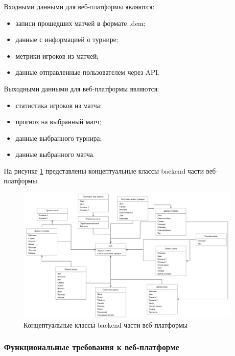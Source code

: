 Входными данными для веб-платформы являются:
\begin{itemize}
	\item записи прошедших матчей в формате .dem;
	\item данные с информацией о турнире;
	\item метрики игроков из матчей;
	\item данные отправленные пользователем через API.
\end{itemize}

Выходными данными для веб-платформы являются:
\begin{itemize}
	\item статистика игроков из матча;
	\item прогноз на выбранный матч;
	\item данные выбранного турнира;
	\item данные выбранного матча.
\end{itemize}

На рисунке \ref{fig:-conceptual_classes} представлены концептуальные классы backend части веб-платформы.
\begin{figure}
	\centering
	\includegraphics[width=0.7\linewidth]{"images/Концептуальные классы"}
	\caption[Концептуальные классы backend части веб-платформы]{Концептуальные классы backend части веб-платформы}
	\label{fig:-conceptual_classes}
\end{figure}

\subsubsection{Функциональные требования к веб-платформе}

